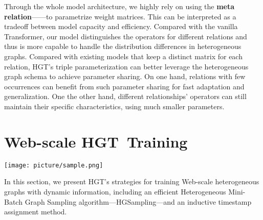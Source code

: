 \documentclass[sigconf]{acmart}
\theoremstyle{definition}
\newcommand{\short}{HGT}
\newcommand{\sampling}{HGSampling}
\begin{document}
{Through the whole model architecture, we highly rely on using the \textbf{meta relation}------to parametrize weight matrices. This can be interpreted as a tradeoff between model capacity and efficiency. Compared with the vanilla Transformer, our model distinguishes the operators for different relations and thus is more capable to handle the distribution differences in heterogeneous graphs. 
Compared with existing models that keep a distinct matrix for each relation, \short's triple parameterization can better leverage the heterogeneous graph schema to achieve parameter sharing. On one hand, relations with few occurrences can benefit from such parameter sharing for fast adaptation and generalization. One the other hand, different relationships' operators can still maintain their specific characteristics, using much smaller parameters. 

}

 



































%
 
\section{Web-scale \short\ Training}\label{sec:train}


 \begin{figure*}[ht!]
    \centering
    \texttt{[image: picture/sample.png]}
    \caption{\sampling\ with Inductive Timestamp Assignment.}
    \label{fig:sample}
\end{figure*} 


In this section, we present \short's strategies for training Web-scale heterogeneous graphs with dynamic information, including an efficient Heterogeneous Mini-Batch Graph Sampling algorithm---\sampling---and an inductive timestamp assignment method. 
\end{document}
